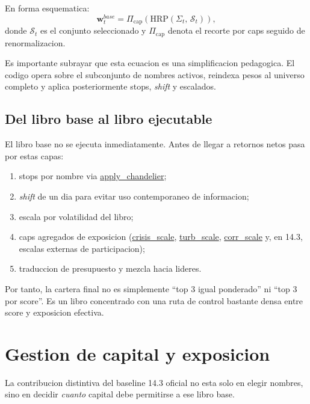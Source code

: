 \documentclass[11pt,letterpaper]{article}
\newcommand{\code}[1]{{\urlstyle{tt}\url{#1}}}
\begin{document}
En forma esquematica:
\begin{equation}
\mathbf{w}^{base}_t = \Pi_{\mathrm{cap}}
\left(
\mathrm{HRP}\!\left(\Sigma_t,\, \mathcal{S}_t\right)
\right),
\end{equation}
donde \(\mathcal{S}_t\) es el conjunto seleccionado y \(\Pi_{\mathrm{cap}}\) denota el recorte por caps seguido de renormalizacion.

Es importante subrayar que esta ecuacion es una simplificacion pedagogica. El codigo opera sobre el subconjunto de nombres activos, reindexa pesos al universo completo y aplica posteriormente stops, \emph{shift} y escalados.

\subsection{Del libro base al libro ejecutable}
El libro base no se ejecuta inmediatamente. Antes de llegar a retornos netos pasa por estas capas:
\begin{enumerate}
    \item stops por nombre via \code{apply\_chandelier};
    \item \emph{shift} de un dia para evitar uso contemporaneo de informacion;
    \item escala por volatilidad del libro;
    \item caps agregados de exposicion (\code{crisis\_scale}, \code{turb\_scale}, \code{corr\_scale} y, en 14.3, escalas externas de participacion);
    \item traduccion de presupuesto y mezcla hacia lideres.
\end{enumerate}

Por tanto, la cartera final no es simplemente \enquote{top 3 igual ponderado} ni \enquote{top 3 por score}. Es un libro concentrado con una ruta de control bastante densa entre score y exposicion efectiva.

\section{Gestion de capital y exposicion}
La contribucion distintiva del baseline 14.3 oficial no esta solo en elegir nombres, sino en decidir \emph{cuanto} capital debe permitirse a ese libro base.
\end{document}
